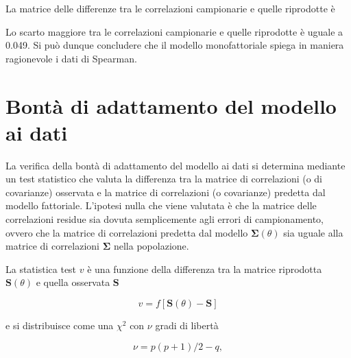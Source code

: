 \documentclass[
  11pt,
]{krantz}
\makeatletter
\newenvironment{Shaded}{\begin{snugshade}}{\end{snugshade}}
\newcommand{\CommentTok}[1]{\textcolor[rgb]{0.37,0.37,0.37}{\textit{#1}}}
\newcommand{\DecValTok}[1]{\textcolor[rgb]{0.06,0.06,0.06}{#1}}
\newcommand{\FunctionTok}[1]{\textcolor[rgb]{0,0,0}{#1}}
\newcommand{\NormalTok}[1]{#1}
\newcommand{\SpecialCharTok}[1]{\textcolor[rgb]{0,0,0}{#1}}
\newenvironment{kframe}{%
\medskip{}
\setlength{\fboxsep}{.8em}
 \def\at@end@of@kframe{}%
 \ifinner\ifhmode%
  \def\at@end@of@kframe{\end{minipage}}%
  \begin{minipage}{\columnwidth}%
 \fi\fi%
 \def\FrameCommand##1{\hskip\@totalleftmargin \hskip-\fboxsep
 \colorbox{shadecolor}{##1}\hskip-\fboxsep
     \hskip-\linewidth \hskip-\@totalleftmargin \hskip\columnwidth}%
 \MakeFramed {\advance\hsize-\width
   \@totalleftmargin\z@ \linewidth\hsize
   \@setminipage}}%
 {\par\unskip\endMakeFramed%
 \at@end@of@kframe}
\renewenvironment{Shaded}{\begin{kframe}}{\end{kframe}}
\theoremstyle{definition}
\theoremstyle{definition}
\theoremstyle{definition}
\theoremstyle{definition}
\theoremstyle{remark}
\makeatother
\begin{document}
La matrice delle differenze tra le correlazioni campionarie e quelle riprodotte è

\begin{Shaded}
\end{Shaded}

Lo scarto maggiore tra le correlazioni campionarie e quelle riprodotte è uguale a 0.049. Si può dunque concludere che il modello monofattoriale spiega in maniera ragionevole i dati di Spearman.

\hypertarget{bontuxe0-di-adattamento-del-modello-ai-dati}{%
\section{Bontà di adattamento del modello ai dati}\label{bontuxe0-di-adattamento-del-modello-ai-dati}}

La verifica della bontà di adattamento del modello ai dati si determina mediante un test statistico che valuta la differenza tra la matrice di correlazioni (o di covarianze) osservata e la matrice di correlazioni (o covarianze) predetta dal modello fattoriale. L'ipotesi nulla che viene valutata è che la matrice delle correlazioni residue sia dovuta semplicemente agli errori di campionamento, ovvero che la matrice di correlazioni predetta dal modello \(\boldsymbol{\Sigma}(\theta)\) sia uguale alla matrice di correlazioni \(\boldsymbol{\Sigma}\) nella popolazione.

La statistica test \(v\) è una funzione della differenza tra la matrice riprodotta \(\boldsymbol{S}(\theta)\) e quella osservata \(\boldsymbol{S}\)

\[
v = f\left[\boldsymbol{S}(\theta) - \boldsymbol{S}\right]
\]

e si distribuisce come una \(\chi^2\) con \(\nu\) gradi di libertà

\[
\nu = p(p+1)/ 2 - q,
\]
\end{document}
